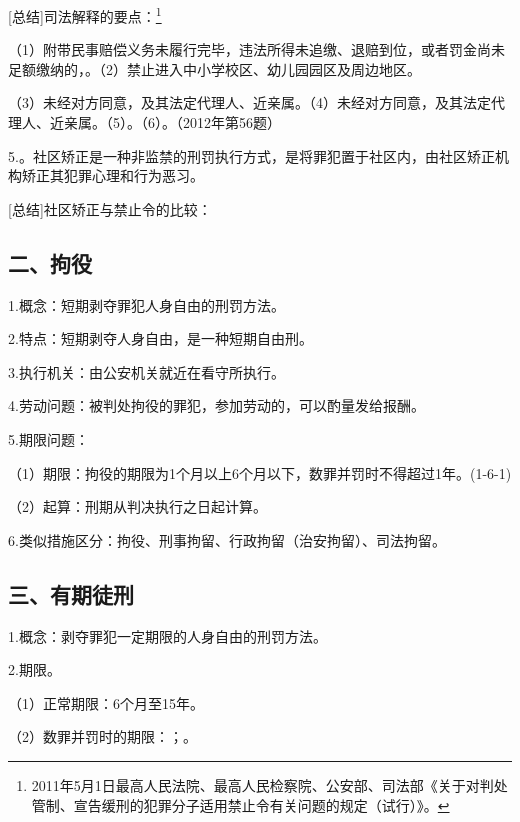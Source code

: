 [总结]司法解释的要点：\footnote{2011年5月1日最高人民法院、最高人民检察院、公安部、司法部《关于对判处管制、宣告缓刑的犯罪分子适用禁止令有关问题的规定（试行）》。}

（1）附带民事赔偿义务未履行完毕，违法所得未追缴、退赔到位，或者罚金尚未足额缴纳的，。（2）禁止进入中小学校区、幼儿园园区及周边地区。

（3）未经对方同意，及其法定代理人、近亲属。（4）未经对方同意，及其法定代理人、近亲属。（5）。（6）。（2012年第56题）

5.。社区矫正是一种非监禁的刑罚执行方式，是将罪犯置于社区内，由社区矫正机构矫正其犯罪心理和行为恶习。

[总结]社区矫正与禁止令的比较：


\subsection*{二、拘役}

1.概念：短期剥夺罪犯人身自由的刑罚方法。

2.特点：短期剥夺人身自由，是一种短期自由刑。

3.执行机关：由公安机关就近在看守所执行。

4.劳动问题：被判处拘役的罪犯，参加劳动的，可以酌量发给报酬。

5.期限问题：

（1）期限：拘役的期限为1个月以上6个月以下，数罪并罚时不得超过1年。(1-6-1)

（2）起算：刑期从判决执行之日起计算。

6.类似措施区分：拘役、刑事拘留、行政拘留（治安拘留）、司法拘留。

\subsection*{三、有期徒刑}

1.概念：剥夺罪犯一定期限的人身自由的刑罚方法。

2.期限。

（1）正常期限：6个月至15年。

（2）数罪并罚时的期限：；。


